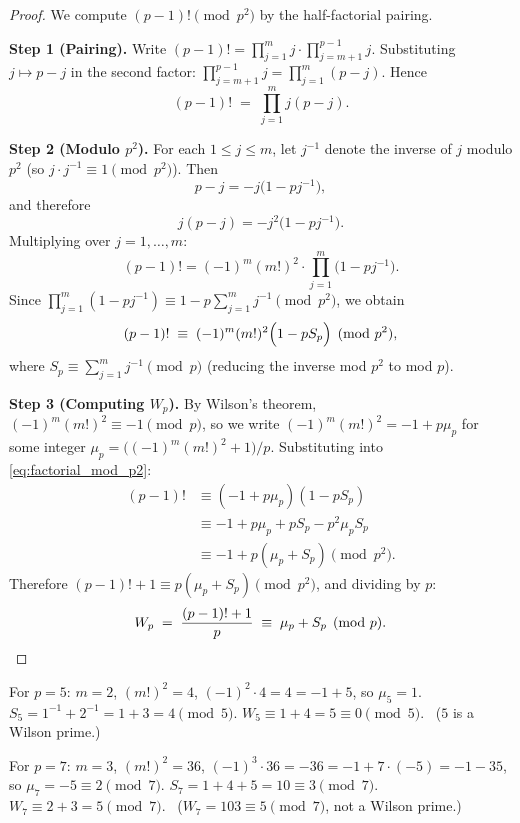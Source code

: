 \documentclass[12pt,a4paper]{amsart}
\theoremstyle{definition}
\begin{document}
\begin{proof}
  We compute $(p-1)! \pmod{p^2}$ by the half-factorial pairing.

  \textbf{Step 1 (Pairing).}
  Write $(p-1)! = \prod_{j=1}^m j \cdot \prod_{j=m+1}^{p-1} j$.
  Substituting $j \mapsto p-j$ in the second factor:
  $\prod_{j=m+1}^{p-1} j = \prod_{j=1}^m (p-j).$
  Hence
  \[
    (p-1)! \;=\; \prod_{j=1}^m j(p-j).
  \]

  \textbf{Step 2 (Modulo $p^2$).}
  For each $1 \leq j \leq m$, let $j^{-1}$ denote the inverse of $j$ modulo $p^2$
  (so $j \cdot j^{-1} \equiv 1 \pmod{p^2}$).  Then
  \[
    p - j = -j\bigl(1 - p j^{-1}\bigr),
  \]
  and therefore
  \[
    j(p-j) = -j^2\bigl(1 - pj^{-1}\bigr).
  \]
  Multiplying over $j = 1, \ldots, m$:
  \[
    (p-1)! = (-1)^m (m!)^2 \cdot \prod_{j=1}^m \bigl(1 - pj^{-1}\bigr).
  \]
  Since $\prod_{j=1}^m(1 - pj^{-1}) \equiv 1 - p\sum_{j=1}^m j^{-1} \pmod{p^2}$,
  we obtain
  \begin{equation}\label{eq:factorial_mod_p2}
    (p-1)! \;\equiv\; (-1)^m(m!)^2 \Bigl(1 - pS_p\Bigr) \pmod{p^2},
  \end{equation}
  where $S_p \equiv \sum_{j=1}^m j^{-1} \pmod p$ (reducing the inverse mod $p^2$
  to mod $p$).

  \textbf{Step 3 (Computing $W_p$).}
  By Wilson's theorem, $(-1)^m(m!)^2 \equiv -1 \pmod p$, so we write
  $(-1)^m(m!)^2 = -1 + p\mu_p$ for some integer $\mu_p = \bigl((-1)^m(m!)^2+1\bigr)/p$.
  Substituting into \eqref{eq:factorial_mod_p2}:
  \begin{align*}
    (p-1)! &\equiv (-1+p\mu_p)(1-pS_p)\\
           &\equiv -1 + p\mu_p + pS_p - p^2\mu_p S_p\\
           &\equiv -1 + p(\mu_p + S_p) \pmod{p^2}.
  \end{align*}
  Therefore $(p-1)! + 1 \equiv p(\mu_p + S_p) \pmod{p^2}$, and dividing by $p$:
  \[
    W_p \;=\; \frac{(p-1)!+1}{p} \;\equiv\; \mu_p + S_p \pmod p. \qedhere
  \]
\end{proof}

\begin{example}
  For $p = 5$: $m = 2$, $(m!)^2 = 4$, $(-1)^2 \cdot 4 = 4 = -1 + 5$,
  so $\mu_5 = 1$.  $S_5 = 1^{-1} + 2^{-1} = 1 + 3 = 4 \pmod 5$.
  $W_5 \equiv 1 + 4 = 5 \equiv 0 \pmod 5$. \checkmark\ ($5$ is a Wilson prime.)

  For $p = 7$: $m = 3$, $(m!)^2 = 36$, $(-1)^3 \cdot 36 = -36 = -1 + 7 \cdot (-5) = -1 - 35$,
  so $\mu_7 = -5 \equiv 2 \pmod 7$.  $S_7 = 1+4+5 = 10 \equiv 3 \pmod 7$.
  $W_7 \equiv 2+3 = 5 \pmod 7$. \checkmark\ ($W_7 = 103 \equiv 5 \pmod 7$, not a Wilson prime.)
\end{example}
\end{document}
